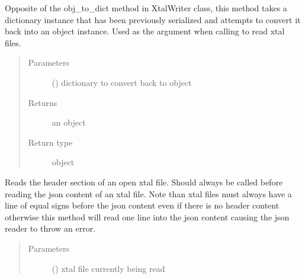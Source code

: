 \documentclass[letterpaper,10pt,english]{sphinxmanual}
\begin{document}
\begin{fulllineitems}
\begin{fulllineitems}
\label{\detokenize{polo.utils:polo.utils.io_utils.RunDeserializer.dict_to_obj}}
Opposite of the obj\_to\_dict method in XtalWriter class, this method
takes a dictionary instance that has been previously serialized and
attempts to convert it back into an object instance. Used as the
 argument when calling  to read xtal files.
\begin{quote}\begin{description}
\item[{Parameters}] \leavevmode
{} () \textendash{} dictionary to convert back to object

\item[{Returns}] \leavevmode
an object

\item[{Return type}] \leavevmode
object

\end{description}\end{quote}

\end{fulllineitems}


\begin{fulllineitems}
\label{\detokenize{polo.utils:polo.utils.io_utils.RunDeserializer.xtal_header_reader}}
Reads the header section of an open xtal file. Should always be
called before reading the json content of an xtal file. Note than
xtal files must always have a line of equal signs before the json
content even if there is no header content otherwise this method will
read one line into the json content causing the json reader to
throw an error.
\begin{quote}\begin{description}
\item[{Parameters}] \leavevmode
{} () \textendash{} xtal file currently being read


\end{description}
\end{quote}
\end{fulllineitems}
\end{fulllineitems}
\end{document}
